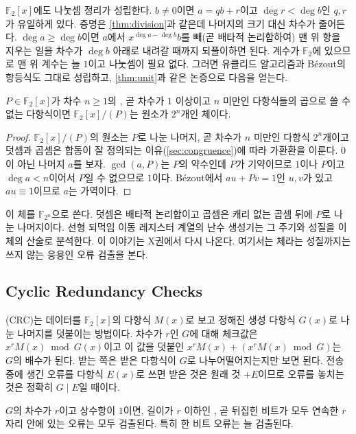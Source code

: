 $\mathbb{F}_2[x]$에도 나눗셈 정리가 성립한다. $b\neq0$이면 $a=qb+r$이고 $\deg r<\deg b$인 $q,r$가 유일하게 있다. 증명은 \cref{thm:division}과 같은데 나머지의 크기 대신 차수가 줄어든다. $\deg a\ge\deg b$이면 $a$에서 $x^{\deg a-\deg b}b$를 빼(곧 배타적 논리합하여) 맨 위 항을 지우는 일을 차수가 $\deg b$ 아래로 내려갈 때까지 되풀이하면 된다. 계수가 $\mathbb{F}_2$에 있으므로 맨 위 계수는 늘 $1$이고 나눗셈이 필요 없다. 그러면 유클리드 알고리즘과 Bézout의 항등식도 그대로 성립하고, \cref{thm:unit}과 같은 논증으로 다음을 얻는다.

\begin{theorem}
\label{thm:gf2n}
$P\in\mathbb{F}_2[x]$가 차수 $n\ge1$의 , 곧 차수가 $1$ 이상이고 $n$ 미만인 다항식들의 곱으로 쓸 수 없는 다항식이면 $\mathbb{F}_2[x]/(P)$는 원소가 $2^n$개인 체이다.
\end{theorem}

\begin{proof}
$\mathbb{F}_2[x]/(P)$의 원소는 $P$로 나눈 나머지, 곧 차수가 $n$ 미만인 다항식 $2^n$개이고 덧셈과 곱셈은 합동이 잘 정의되는 이유(\cref{sec:congruence})에 따라 가환환을 이룬다. $0$이 아닌 나머지 $a$를 보자. $\gcd(a,P)$는 $P$의 약수인데 $P$가 기약이므로 $1$이나 $P$이고 $\deg a<n$이어서 $P$일 수 없으므로 $1$이다. Bézout에서 $au+Pv=1$인 $u,v$가 있고 $au\equiv1$이므로 $a$는 가역이다.
\end{proof}

이 체를 $\mathbb{F}_{2^n}$으로 쓴다. 덧셈은 배타적 논리합이고 곱셈은 캐리 없는 곱셈 뒤에 $P$로 나눈 나머지이다. 선형 되먹임 이동 레지스터 계열의 난수 생성기는 그 주기와 성질을 이 체의 산술로 분석한다. 이 이야기는 X권에서 다시 나온다. 여기서는 체라는 성질까지는 쓰지 않는 응용인 오류 검출을 본다.

\subsection{Cyclic Redundancy Checks}

(CRC)는 데이터를 $\mathbb{F}_2[x]$의 다항식 $M(x)$로 보고 정해진 생성 다항식 $G(x)$로 나눈 나머지를 덧붙이는 방법이다\cite{peterson1961cyclic}. 차수가 $r$인 $G$에 대해 체크값은 $x^rM(x)\bmod G(x)$이고 이 값을 덧붙인 $x^rM(x)+(x^rM(x)\bmod G)$는 $G$의 배수가 된다. 받는 쪽은 받은 다항식이 $G$로 나누어떨어지는지만 보면 된다. 전송 중에 생긴 오류를 다항식 $E(x)$로 쓰면 받은 것은 원래 것 $+E$이므로 오류를 놓치는 것은 정확히 $G\mid E$일 때이다.

\begin{theorem}
\label{thm:crc-burst}
$G$의 차수가 $r$이고 상수항이 $1$이면, 길이가 $r$ 이하인 , 곧 뒤집힌 비트가 모두 연속한 $r$자리 안에 있는 오류는 모두 검출된다. 특히 한 비트 오류는 늘 검출된다.
\end{theorem}

